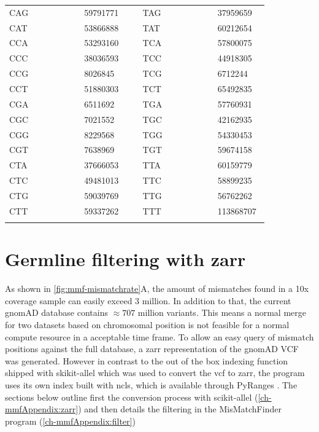 \begin{table}[ht]
\begin{tabular}{|C{0.26\linewidth} | R{0.14\linewidth}| C{0.04\linewidth} |C{0.26\linewidth} | R{0.14\linewidth}|}
CAG & \num{ 59791771} &  &TAG & \num{ 37959659} \\
CAT & \num{ 53866888} &  &TAT & \num{ 60212654} \\
CCA & \num{ 53293160} &  &TCA & \num{ 57800075} \\
CCC & \num{ 38036593} &  &TCC & \num{ 44918305} \\
CCG & \num{ 8026845} &  &TCG & \num{ 6712244} \\
CCT & \num{ 51880303} &  &TCT & \num{ 65492835} \\
CGA & \num{ 6511692} &  &TGA & \num{ 57760931} \\
CGC & \num{ 7021552} &  &TGC & \num{ 42162935} \\
CGG & \num{ 8229568} &  &TGG & \num{ 54330453} \\
CGT & \num{ 7638969} &  &TGT & \num{ 59674158} \\
CTA & \num{ 37666053} &  &TTA & \num{ 60159779} \\
CTC & \num{ 49481013} &  &TTC & \num{ 58899235} \\
CTG & \num{ 59039769} &  &TTG & \num{ 56762262} \\
CTT & \num{ 59337262} &  &TTT & \num{ 113868707} \\
\hhline{|-|-|~|-|-|}
\bottomrule
\end{tabular}
\end{table}

\afterpage{\clearpage}


\section{Germline filtering with zarr}
\label{ch-mmfAppendix:germlineFilter}
As shown in \autoref{fig:mmf-mismatchrate}A, the amount of mismatches found in a 10x coverage sample can easily exceed $3$ million. In addition to that, the current gnomAD database contains $ \approx 707$ million variants. This means a normal merge for two datasets based on chromosomal position is not feasible for a normal compute resource in a acceptable time frame. To allow an easy query of mismatch positions against the full database, a zarr \cite{Miles2021}representation of the gnomAD VCF was generated. However in contrast to the out of the box indexing function shipped with skikit-allel \cite{Miles2021a} which was used to convert the vcf to zarr, the program uses its own index built with ncls, which is available through PyRanges \cite{Stovner2019}. The sections below outline first the conversion process with scikit-allel (\autoref{ch-mmfAppendix:zarr}) and then details the filtering in the MisMatchFinder program (\autoref{ch-mmfAppendix:filter})

